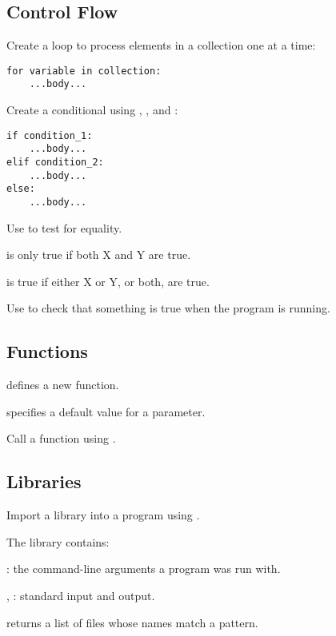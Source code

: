 \subsection*{Control Flow}

\begin{swcitemize}
\item
  Create a  loop to process elements in a collection one at
  a time:

\begin{Verbatim}
for variable in collection:
    ...body...
\end{Verbatim}
\item
  Create a conditional using , , and
  :

\begin{Verbatim}
if condition_1:
    ...body...
elif condition_2:
    ...body...
else:
    ...body...
\end{Verbatim}
\item
  Use \code{==} to test for equality.
\item
   is only true if both X and Y are true.
\item
   is true if either X or Y, or both, are true.
\item
  Use  to check that something is true
  when the program is running.
\end{swcitemize}

\subsection*{Functions}

\begin{swcitemize}
\item
   defines a new function.
\item
   specifies a default value for a
  parameter.
\item
  Call a function using .
\end{swcitemize}

\subsection*{Libraries}

\begin{swcitemize}
\item
  Import a library into a program using .
\item
  The  library contains:

  \begin{swcitemize2}
  \item
    : the command-line arguments a program was run
    with.
  \item
    , : standard input and output.
   \end{swcitemize2}
\item
   returns a list of files whose names match
  a pattern.
\end{swcitemize}

